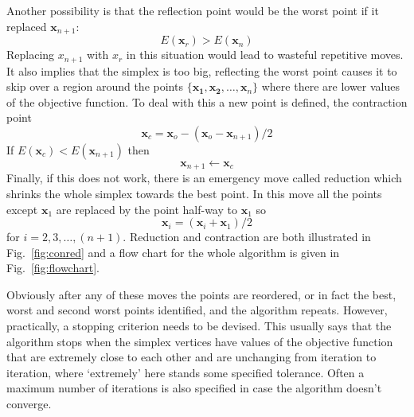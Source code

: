 \documentclass[11pt,a4paper]{scrartcl}
\begin{document}
Another possibility is that the reflection point would be the worst
point if it replaced $\mathbf{x}_{n+1}$:
\begin{equation}
E(\mathbf{x}_r)>E(\mathbf{x}_n)
\end{equation}
Replacing $x_{n+1}$ with $x_r$ in this situation would lead to
wasteful repetitive moves. It also implies that the simplex is too
big, reflecting the worst point causes it to skip over a region around
the points $\{\mathbf{x_1},\mathbf{x_2},\ldots,\mathbf{x}_n\}$ where
there are lower values of the objective function. To deal with this a
new point is defined, the contraction point
\begin{equation}
\mathbf{x}_c=\mathbf{x}_o-(\mathbf{x}_o-\mathbf{x}_{n+1})/2
\end{equation}
If $E(\mathbf{x}_c)<E(\mathbf{x}_{n+1})$ then
\begin{equation}
\mathbf{x}_{n+1}\leftarrow \mathbf{x}_c
\end{equation}
Finally, if this does not work, there is an emergency move called
reduction which shrinks the whole simplex towards the best point. In
this move all the points except $\mathbf{x}_1$ are replaced by the
point half-way to $\mathbf{x}_1$ so
\begin{equation}
\mathbf{x}_i=(\mathbf{x}_i+\mathbf{x}_1)/2
\end{equation}
for $i=2,3,\ldots,(n+1)$. Reduction and contraction are both
illustrated in Fig.~\ref{fig:conred} and a flow chart for the whole
algorithm is given in Fig.~\ref{fig:flowchart}.

Obviously after any of these moves the points are reordered, or in
fact the best, worst and second worst points identified, and the
algorithm repeats. However, practically, a stopping criterion needs to
be devised. This usually says that the algorithm stops when the
simplex vertices have values of the objective function that are
extremely close to each other and are unchanging from iteration to
iteration, where \lq{}extremely\rq{} here stands some specified
tolerance. Often a maximum number of iterations is also specified in
case the algorithm doesn't converge.
\end{document}
